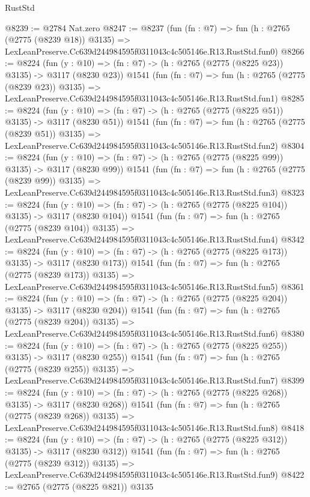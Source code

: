 \begin{lexlean}{RustStd}
\begin{coremodule}
@8239 := @2784 Nat.zero
@8247 := @8237
    (fun (fn : @7) =>
    fun (h : @2765 (@2775 (@8239 @18)) @3135) =>
    LexLeanPreserve.Cc639d244984595f0311043c4c505146e.R13.RustStd.fun0)
@8266 := @8224
    (fun (y : @10) => (fn : @7) -> (h : @2765 (@2775 (@8225 @23)) @3135) -> @3117 (@8230 @23))
    @1541
    (fun (fn : @7) =>
    fun (h : @2765 (@2775 (@8239 @23)) @3135) =>
    LexLeanPreserve.Cc639d244984595f0311043c4c505146e.R13.RustStd.fun1)
@8285 := @8224
    (fun (y : @10) => (fn : @7) -> (h : @2765 (@2775 (@8225 @51)) @3135) -> @3117 (@8230 @51))
    @1541
    (fun (fn : @7) =>
    fun (h : @2765 (@2775 (@8239 @51)) @3135) =>
    LexLeanPreserve.Cc639d244984595f0311043c4c505146e.R13.RustStd.fun2)
@8304 := @8224
    (fun (y : @10) => (fn : @7) -> (h : @2765 (@2775 (@8225 @99)) @3135) -> @3117 (@8230 @99))
    @1541
    (fun (fn : @7) =>
    fun (h : @2765 (@2775 (@8239 @99)) @3135) =>
    LexLeanPreserve.Cc639d244984595f0311043c4c505146e.R13.RustStd.fun3)
@8323 := @8224
    (fun (y : @10) => (fn : @7) -> (h : @2765 (@2775 (@8225 @104)) @3135) -> @3117 (@8230 @104))
    @1541
    (fun (fn : @7) =>
    fun (h : @2765 (@2775 (@8239 @104)) @3135) =>
    LexLeanPreserve.Cc639d244984595f0311043c4c505146e.R13.RustStd.fun4)
@8342 := @8224
    (fun (y : @10) => (fn : @7) -> (h : @2765 (@2775 (@8225 @173)) @3135) -> @3117 (@8230 @173))
    @1541
    (fun (fn : @7) =>
    fun (h : @2765 (@2775 (@8239 @173)) @3135) =>
    LexLeanPreserve.Cc639d244984595f0311043c4c505146e.R13.RustStd.fun5)
@8361 := @8224
    (fun (y : @10) => (fn : @7) -> (h : @2765 (@2775 (@8225 @204)) @3135) -> @3117 (@8230 @204))
    @1541
    (fun (fn : @7) =>
    fun (h : @2765 (@2775 (@8239 @204)) @3135) =>
    LexLeanPreserve.Cc639d244984595f0311043c4c505146e.R13.RustStd.fun6)
@8380 := @8224
    (fun (y : @10) => (fn : @7) -> (h : @2765 (@2775 (@8225 @255)) @3135) -> @3117 (@8230 @255))
    @1541
    (fun (fn : @7) =>
    fun (h : @2765 (@2775 (@8239 @255)) @3135) =>
    LexLeanPreserve.Cc639d244984595f0311043c4c505146e.R13.RustStd.fun7)
@8399 := @8224
    (fun (y : @10) => (fn : @7) -> (h : @2765 (@2775 (@8225 @268)) @3135) -> @3117 (@8230 @268))
    @1541
    (fun (fn : @7) =>
    fun (h : @2765 (@2775 (@8239 @268)) @3135) =>
    LexLeanPreserve.Cc639d244984595f0311043c4c505146e.R13.RustStd.fun8)
@8418 := @8224
    (fun (y : @10) => (fn : @7) -> (h : @2765 (@2775 (@8225 @312)) @3135) -> @3117 (@8230 @312))
    @1541
    (fun (fn : @7) =>
    fun (h : @2765 (@2775 (@8239 @312)) @3135) =>
    LexLeanPreserve.Cc639d244984595f0311043c4c505146e.R13.RustStd.fun9)
@8422 := @2765 (@2775 (@8225 @821)) @3135

\end{coremodule}
\end{lexlean}

